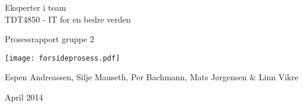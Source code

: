 \begin{titlepage}
\begin{center}
{\LARGE Eksperter i team\\
TDT4850 - IT for en bedre verden}
\par
{\LARGE Prosessrapport gruppe 2}
\par
\vspace{0.5in}
\texttt{[image: forsideprosess.pdf]}

\par

\vfill{}
\vspace{0.5in}
Espen Andreassen, Silje Mauseth, Per Bachmann, Mats Jørgensen \& Linn Vikre
\par
April 2014
\end{center}
\end{titlepage}
